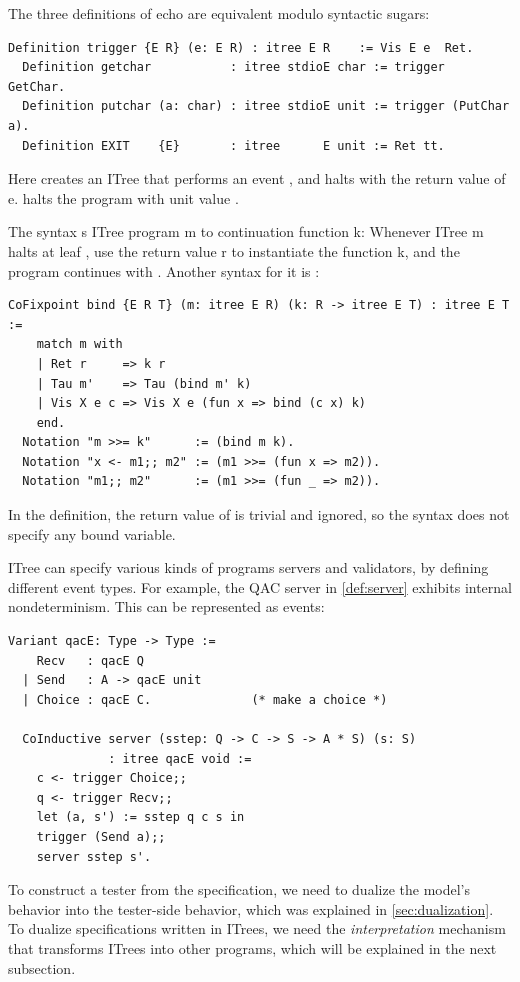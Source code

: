 The three definitions of echo are equivalent modulo syntactic sugars:
\begin{lstlisting}[style=customcoq]
  Definition trigger {E R} (e: E R) : itree E R    := Vis E e  Ret.
  Definition getchar           : itree stdioE char := trigger  GetChar.
  Definition putchar (a: char) : itree stdioE unit := trigger (PutChar a).
  Definition EXIT    {E}       : itree      E unit := Ret tt.
\end{lstlisting}

Here  creates an ITree that performs an event ,
and halts with the return value of \ilc e.   halts the program with
unit value .

The  syntax s ITree program \ilc m to continuation
function \ilc k: Whenever ITree \ilc m halts at leaf , use the
return value \ilc r to instantiate the function \ilc k, and the program
continues with .  Another syntax for it is :
\begin{lstlisting}[style=customcoq]
  CoFixpoint bind {E R T} (m: itree E R) (k: R -> itree E T) : itree E T :=
    match m with
    | Ret r     => k r
    | Tau m'    => Tau (bind m' k)
    | Vis X e c => Vis X e (fun x => bind (c x) k)
    end.
  Notation "m >>= k"      := (bind m k).
  Notation "x <- m1;; m2" := (m1 >>= (fun x => m2)).
  Notation "m1;; m2"      := (m1 >>= (fun _ => m2)).
\end{lstlisting}

In the  definition, the return value of  is trivial and
ignored, so the syntax  does not specify any bound
variable.

ITree can specify various kinds of programs servers and validators, by defining
different event types.  For example, the QAC server in \autoref{def:server}
exhibits internal nondeterminism.  This can be represented as 
events:
\begin{lstlisting}[style=customcoq]
  Variant qacE: Type -> Type :=
    Recv   : qacE Q
  | Send   : A -> qacE unit
  | Choice : qacE C.              (* make a choice *)
  
  CoInductive server (sstep: Q -> C -> S -> A * S) (s: S)
              : itree qacE void :=
    c <- trigger Choice;;
    q <- trigger Recv;;
    let (a, s') := sstep q c s in
    trigger (Send a);;
    server sstep s'.
\end{lstlisting}

To construct a tester from the specification, we need to dualize the model's
behavior into the tester-side behavior, which was explained in
\autoref{sec:dualization}.  To dualize specifications written in ITrees, we need
the {\em interpretation} mechanism that transforms ITrees into other programs,
which will be explained in the next subsection.

